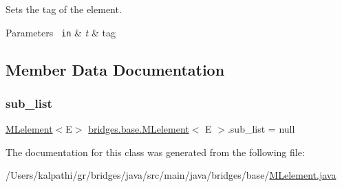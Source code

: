 Sets the tag of the element.


\begin{DoxyParams}[1]{Parameters}
\mbox{\texttt{ in}}  & {\em t} & tag \\
\hline
\end{DoxyParams}


\subsection{Member Data Documentation}
\mbox{\label{classbridges_1_1base_1_1_m_lelement_a7dee2985f9a8134d3076eb9478422403}} 
\subsubsection{\texorpdfstring{sub\_list}{sub\_list}}
{\footnotesize\ttfamily \mbox{\hyperlink{classbridges_1_1base_1_1_m_lelement}{M\+Lelement}}$<$E$>$ \mbox{\hyperlink{classbridges_1_1base_1_1_m_lelement}{bridges.\+base.\+M\+Lelement}}$<$ E $>$.sub\+\_\+list = null\hspace{0.3cm}{\ttfamily [protected]}}



The documentation for this class was generated from the following file\+:\begin{DoxyCompactItemize}
\item 
/\+Users/kalpathi/gr/bridges/java/src/main/java/bridges/base/\mbox{\hyperlink{_m_lelement_8java}{M\+Lelement.\+java}}\end{DoxyCompactItemize}
